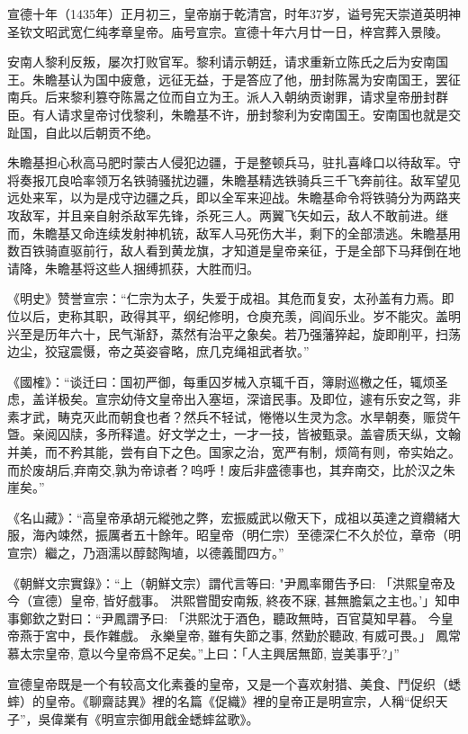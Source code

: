 宣德十年（1435年）正月初三，皇帝崩于乾清宫，时年37岁，谥号宪天崇道英明神圣钦文昭武宽仁纯孝章皇帝。庙号宣宗。宣德十年六月廿一日，梓宫葬入景陵。

安南人黎利反叛，屡次打败官军。黎利请示朝廷，请求重新立陈氏之后为安南国王。朱瞻基认为国中疲惫，远征无益，于是答应了他，册封陈暠为安南国王，罢征南兵。后来黎利篡夺陈暠之位而自立为王。派人入朝纳贡谢罪，请求皇帝册封群臣。有人请求皇帝讨伐黎利，朱瞻基不许，册封黎利为安南国王。安南国也就是交趾国，自此以后朝贡不绝。

朱瞻基担心秋高马肥时蒙古人侵犯边疆，于是整顿兵马，驻扎喜峰口以待敌军。守将奏报兀良哈率领万名铁骑骚扰边疆，朱瞻基精选铁骑兵三千飞奔前往。敌军望见远处来军，以为是戍守边疆之兵，即以全军来迎战。朱瞻基命令将铁骑分为两路夹攻敌军，并且亲自射杀敌军先锋，杀死三人。两翼飞矢如云，敌人不敢前进。继而，朱瞻基又命连续发射神机铳，敌军人马死伤大半，剩下的全部溃逃。朱瞻基用数百铁骑直驱前行，敌人看到黄龙旗，才知道是皇帝亲征，于是全部下马拜倒在地请降，朱瞻基将这些人捆缚抓获，大胜而归。

《明史》赞誉宣宗：“仁宗为太子，失爱于成祖。其危而复安，太孙盖有力焉。即位以后，吏称其职，政得其平，纲纪修明，仓庾充羡，闾阎乐业。岁不能灾。盖明兴至是历年六十，民气渐舒，蒸然有治平之象矣。若乃强藩猝起，旋即削平，扫荡边尘，狡寇震慑，帝之英姿睿略，庶几克绳祖武者欤。”

《國榷》：“谈迁曰：国初严御，每重囚岁械入京辄千百，簿尉巡檄之任，辄烦圣虑，盖详极矣。宣宗幼侍文皇帝出入塞垣，深谙民事。及即位，遽有乐安之驾，非素才武，畴克灭此而朝食也者？然兵不轻试，惓惓以生灵为念。水旱朝奏，赈贷午曁。亲阅囚牍，多所释遣。好文学之士，一才一技，皆被甄录。盖睿质天纵，文翰并美，而不矜其能，尝有自下之色。国家之治，宽严有制，烦简有则，帝实始之。而於废胡后,弃南交,孰为帝谅者？呜呼！废后非盛德事也，其弃南交，比於汉之朱崖矣。”

《名山藏》：“高皇帝承胡元縱弛之弊，宏振威武以儆天下，成祖以英達之資纘緒大服，海內竦然，振厲者五十餘年。昭皇帝（明仁宗）至德深仁不久於位，章帝（明宣宗）繼之，乃涵濡以醇懿陶埴，以德義聞四方。”

《朝鮮文宗實錄》：“上（朝鮮文宗）謂代言等曰: "尹鳳率爾告予曰: 「洪熙皇帝及今（宣德）皇帝, 皆好戲事。 洪熙嘗聞安南叛, 終夜不寐, 甚無膽氣之主也。’」知申事鄭欽之對曰：“尹鳳謂予曰: 「洪熙沈于酒色，聽政無時，百官莫知早暮。 今皇帝燕于宮中，長作雜戲。 永樂皇帝, 雖有失節之事, 然勤於聽政, 有威可畏。」 鳳常慕太宗皇帝, 意以今皇帝爲不足矣。”上曰：「人主興居無節, 豈美事乎?」”

宣德皇帝既是一个有较高文化素養的皇帝，又是一个喜欢射猎、美食、鬥促织（蟋蟀）的皇帝。《聊齋誌異》裡的名篇《促織》裡的皇帝正是明宣宗，人稱“促织天子”，吳偉業有《明宣宗御用戧金蟋蟀盆歌》。

